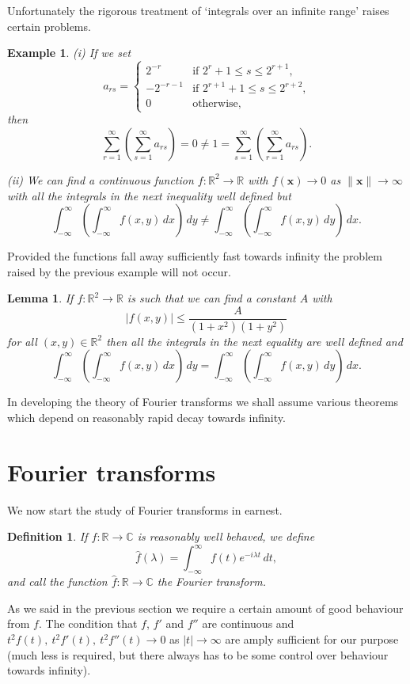 \documentclass[12pt]{article}
\newtheorem{lemma}[theorem]{Lemma}
\newtheorem{definition}[theorem]{Definition}
\newtheorem{example}[theorem]{Example}
\theoremstyle{definition}
\begin{document}
Unfortunately the rigorous treatment of `integrals over
an infinite range' raises certain problems.
\begin{example} (i) If we set 
\begin{equation*} 
a_{rs}=\begin{cases}2^{-r}&\text{if $2^{r}+1\leq s\leq 2^{r+1}$,}\\
-2^{-r-1}&\text{if $2^{r+1}+1\leq s\leq 2^{r+2}$,}\\
0&\text{otherwise,}
\end{cases}
\end{equation*}
then
\[\sum_{r=1}^{\infty}\left(\sum_{s=1}^{\infty}a_{rs}\right)=0
\neq 1=\sum_{s=1}^{\infty}\left(\sum_{r=1}^{\infty}a_{rs}\right).\]

(ii) We can find a continuous function 
$f:{\mathbb R}^{2}\rightarrow{\mathbb R}$ with
$f({\mathbf x})\rightarrow 0$ as $\|{\mathbf x}\|\rightarrow\infty$
with all the integrals in the next inequality well defined but
\[\int_{-\infty}^{\infty}\left(\int_{-\infty}^{\infty}f(x,y)\,dx\right)\,dy
\neq
\int_{-\infty}^{\infty}\left(\int_{-\infty}^{\infty}f(x,y)\,dy\right)\,dx.\]
\end{example}

Provided the functions fall away sufficiently fast towards infinity
the problem raised by the previous example will not occur.
\begin{lemma}  If
$f:{\mathbb R}^{2}\rightarrow{\mathbb R}$ is such that we can find
a constant $A$ with
\[|f(x,y)|\leq\frac{A}{(1+x^{2})(1+y^{2})}\]
for all $(x,y)\in{\mathbb R}^{2}$ then
all the integrals in the next equality are well defined and
\[\int_{-\infty}^{\infty}\left(\int_{-\infty}^{\infty}f(x,y)\,dx\right)\,dy
=
\int_{-\infty}^{\infty}\left(\int_{-\infty}^{\infty}f(x,y)\,dy\right)\,dx.\]
\end{lemma}

In developing the theory of Fourier transforms we shall
assume various theorems which depend on reasonably rapid decay towards 
infinity.
\section{Fourier transforms} We now start the study
of Fourier transforms in earnest.

\begin{definition} If $f:{\mathbb R}\rightarrow{\mathbb C}$
is reasonably well behaved, we define
\[\hat{f}(\lambda)
=\int_{-\infty}^{\infty}f(t)e^{-i\lambda t}\,dt,\]
and call the function
$\hat{f}:{\mathbb R}\rightarrow{\mathbb C}$
the \emph{Fourier transform}.
\end{definition}
As we said in the previous section we require
a certain amount of good behaviour from $f$.
The condition that $f$, $f'$ and $f''$
are continuous and
$t^{2}f(t),\ t^{2}f'(t),\ t^{2}f''(t)\rightarrow 0$
as $|t|\rightarrow\infty$ are amply sufficient
for our purpose (much less is required,  but there
always has to be some control over behaviour towards
infinity).
\end{document}
